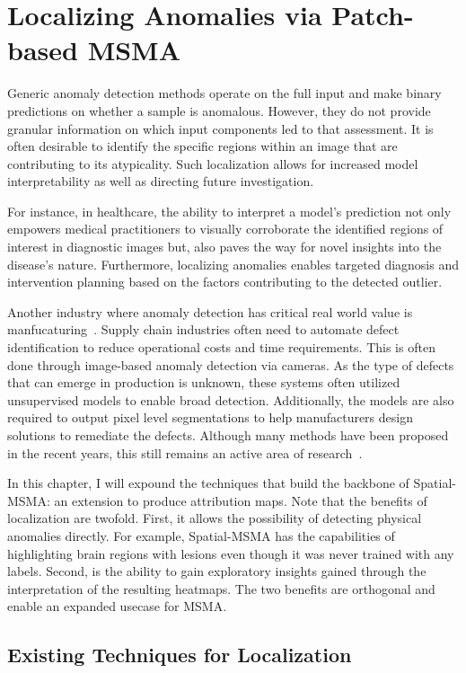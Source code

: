 \chapter{Localizing Anomalies via Patch-based MSMA}
\label{ch:localizing}

Generic anomaly detection methods operate on the full input and make binary predictions on whether a sample is anomalous. However, they do not provide granular information on which input components led to that assessment. It is often desirable to identify the specific regions within an image that are contributing to its atypicality. Such localization allows for increased model interpretability as well as directing future investigation. 

For instance, in healthcare, the ability to interpret a model's prediction not only empowers medical practitioners to visually corroborate the identified regions of interest in diagnostic images but, also paves the way for novel insights into the disease's nature. Furthermore, localizing anomalies enables targeted diagnosis and intervention planning based on the factors contributing to the detected outlier.

Another industry where anomaly detection has critical real world value is manfucaturing~\cite{Bergmann_2019_CVPR}. Supply chain industries often need to automate defect identification to reduce operational costs and time requirements. This is often done through image-based anomaly detection via cameras. As the type of defects that can emerge in production is unknown, these systems often utilized unsupervised models to enable broad detection. Additionally,  the models are also required to output pixel level segmentations to help manufacturers design solutions to remediate the defects. Although many methods have been proposed in the recent years, this still remains an active area of research~\cite{liu2024deep}. 


In this chapter, I will expound the techniques that build the backbone of Spatial-MSMA: an extension to produce attribution maps. Note that the benefits of localization are twofold. First, it allows the possibility of detecting physical anomalies directly. For example, Spatial-MSMA has the capabilities of highlighting brain regions with lesions even though it was never trained with any labels. Second, is the ability to gain exploratory insights gained through the interpretation of the resulting heatmaps. The two benefits are orthogonal and enable an expanded usecase for MSMA.

\section{Existing Techniques for Localization}

